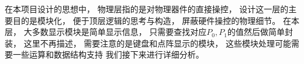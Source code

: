 \documentclass[../main.tex]{subfiles} %
\begin{document}
在本项目设计的思想中，
物理层指的是对物理器件的直接操控，
设计这一层的主要目的是模块化，
便于顶层逻辑的思考与构造，
屏蔽硬件操控的物理细节。
在本层，
大多数显示模块是简单显示信息，
只需要查找对应$P_0,P_1$的值然后做简单封装，
这里不再描述，
需要注意的是键盘和点阵显示的模块，
这些模块处理可能需要一些运算和数据结构支持
我们接下来进行详细分析。
\end{document}
